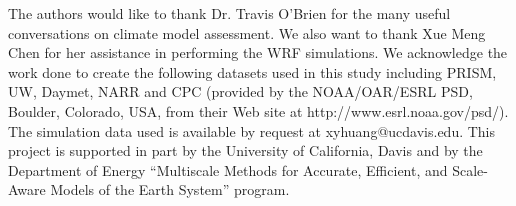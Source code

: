 \documentclass[draft,ms]{agutex}   %
\begin{document}
\begin{article}
\begin{acknowledgments}


The authors would like to thank Dr. Travis O'Brien for the many useful conversations on climate model assessment. We also want to thank Xue Meng Chen for her assistance in performing the WRF simulations. We acknowledge the work done to create the following datasets used in this study including PRISM, UW, Daymet, NARR and CPC (provided by the NOAA/OAR/ESRL PSD, Boulder, Colorado, USA, from their Web site at http://www.esrl.noaa.gov/psd/). The simulation data used is available by request at xyhuang@ucdavis.edu. This project is supported in part by the University of California, Davis and by the Department of Energy ``Multiscale Methods for Accurate, Efficient, and Scale-Aware Models of the Earth System'' program. 
\end{acknowledgments}



 
 








\end{article}
\end{document}
